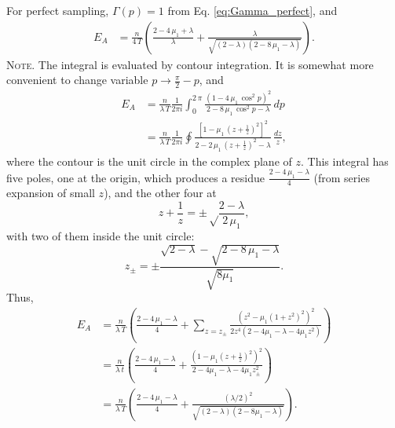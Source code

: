 \documentclass[preprint, floatfix]{revtex4-1}
\newcommand{\note}[1]{{\color{DarkGreen}\footnotesize \textsc{Note.} #1}}
\newcommand{\Err}{E}
\begin{document}
For perfect sampling,
$\Gamma(p) = 1$ from Eq. \eqref{eq:Gamma_perfect},
and
$$
\begin{aligned}
  \Err_A
  &=
  \frac{n}{4 \, T}
  \left(
    \frac{2 - 4 \, \mu_1 + \lambda}{ \lambda }
    +
    \frac{ \lambda }
    { \sqrt{ (2 - \lambda) (2 - 8 \, \mu_1 - \lambda) } }
  \right)
.
\end{aligned}
$$
\note{The integral is evaluated by contour integration.
%
It is somewhat more convenient to change variable $p \to \frac{ \pi } { 2 } - p$,
and
$$
\begin{aligned}
  \Err_A
  &=
  \frac{n}{\lambda \, T}
  \frac{1}{2 \pi i}
  \int_0^{2 \, \pi}
  \frac{ \left(1 - 4 \, \mu_1 \, \cos^2 p \right)^2 }
  { 2 - 8 \, \mu_1 \, \cos^2 p - \lambda }
  \, dp
  \\
  &=
  \frac{n}{\lambda \, T}
  \frac{1}{2 \pi i}
  \oint
  \frac{ \left[1 - \mu_1 \, \left(z+\frac{1}{z}\right)^2 \right]^2 }
  { 2 - 2 \, \mu_1 \, \left(z + \frac{1}{z}\right)^2 - \lambda }
  \, \frac{dz}{z}
  ,
\end{aligned}
$$
where the contour is the unit circle
in the complex plane of $z$.
%
This integral has five poles, one at the origin,
which produces a residue
$\frac{2 - 4 \, \mu_1 - \lambda}{4}$
(from series expansion of small $z$),
and the other four at
$$
z + \frac{1}{z} = \pm\sqrt\frac{2-\lambda}{2 \, \mu_1},
$$
with two of them inside the unit circle:
$$
z_\pm = \pm \frac{\sqrt{2-\lambda} -\sqrt{2 - 8 \, \mu_1 - \lambda}}
{\sqrt{8 \mu_1}}.
$$
Thus,
$$
\begin{aligned}
\Err_A
&=
\frac{      n       }
     { \lambda \, T }
\left(
 \frac{ 2 - 4 \, \mu_1 - \lambda }
      {          4               }
 +
 \sum_{z = z_{\pm} }
 \frac{ \left(z^2 - \mu_1 (1 + z^2)^2 \right)^2 }
 { 2 z^4 (2 - 4 \mu_1 - \lambda - 4 \mu_1 z^2) }
\right)
\\
&=
\frac{       n      }
     { \lambda \, t }
\left(
  \frac{ 2 - 4 \, \mu_1 - \lambda }
       {          4               }
 +
 \frac{ \left(1 - \mu_1 \left(z + \frac{1}{z} \right)^2 \right)^2 }
      { 2 - 4 \mu_1 - \lambda - 4 \mu_1 z_{\pm}^2                 }
\right)
\\
&=
\frac{       n      }
     { \lambda \, T }
\left(
  \frac{ 2 - 4 \, \mu_1 - \lambda }
       {          4               }
 +
 \frac{ (\lambda/2)^2 }
 { \sqrt{(2-\lambda) (2 - 8 \mu_1 -\lambda)} }
\right).
\end{aligned}
$$
}
\end{document}
